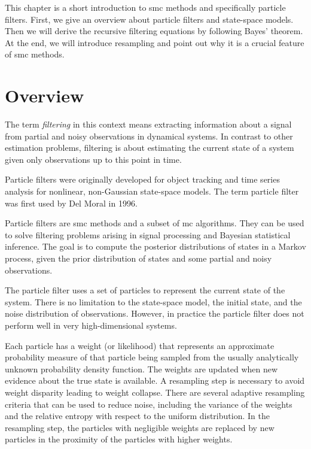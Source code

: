 
This chapter is a short introduction to \gls{smc} methods and specifically particle filters. First, we give an overview about particle filters and state-space models. Then we will derive the recursive filtering equations by following Bayes' theorem. At the end, we will introduce resampling and point out why it is a crucial feature of \gls{smc} methods.

\section{Overview}

The term \textit{filtering} in this context means extracting information about a signal from partial and noisy observations in dynamical systems. In contrast to other estimation problems, filtering is about estimating the current state of a system given only observations up to this point in time.\cite{AppliedOptimalEstimation}

Particle filters were originally developed for object tracking and time series analysis for nonlinear, non-Gaussian state-space models.\cite{Gordon1993} The term particle filter was first used by Del Moral in 1996.\cite{Moral1996}

Particle filters are \gls{smc} methods and a subset of \gls{mc} algorithms. They can be used to solve filtering problems arising in signal processing and Bayesian statistical inference. The goal is to compute the posterior distributions of states in a Markov process, given the prior distribution of states and some partial and noisy observations.

The particle filter uses a set of particles to represent the current state of the system. There is no limitation to the state-space model, the initial state, and the noise distribution of observations. However, in practice the particle filter does not perform well in very high-dimensional systems.

Each particle has a weight (or likelihood) that represents an approximate probability measure of that particle being sampled from the usually analytically unknown probability density function. The weights are updated when new evidence about the true state is available. A resampling step is necessary to avoid weight disparity leading to weight collapse. There are several adaptive resampling criteria that can be used to reduce noise, including the variance of the weights and the relative entropy with respect to the uniform distribution. In the resampling step, the particles with negligible weights are replaced by new particles in the proximity of the particles with higher weights.\cite{Moral1996}\cite{Moral2012}

